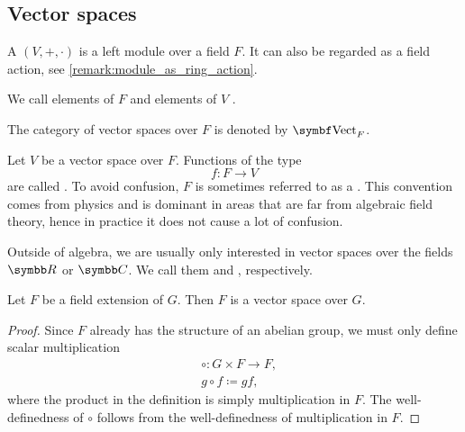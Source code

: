 \subsection{Vector spaces}\label{subsec:vector_spaces}

\begin{definition}\label{def:vector_space}
  A  \( (V, +, \cdot) \) is a left module over a field \( F \). It can also be regarded as a field action, see \cref{remark:module_as_ring_action}.

  We call elements of \( F \)  and elements of \( V \) .

  The category of vector spaces over \( F \) is denoted by \( \Cat{Vect}_F \).
\end{definition}

\begin{definition}\label{def:vector_field}
  Let \( V \) be a vector space over \( F \). Functions of the type
  \begin{equation*}
    f: F \to V
  \end{equation*}
  are called . To avoid confusion, \( F \) is sometimes referred to as a . This convention comes from physics and is dominant in areas that are far from algebraic field theory, hence in practice it does not cause a lot of confusion.
\end{definition}

\begin{remark}\label{remark:real_vector_space}
  Outside of algebra, we are usually only interested in vector spaces over the fields \( \R \) or \( \BB{C} \). We call them  and , respectively.
\end{remark}

\begin{proposition}\label{thm:field_extension_is_vector_space}
  Let \( F \) be a field extension of \( G \). Then \( F \) is a vector space over \( G \).
\end{proposition}
\begin{proof}
  Since \( F \) already has the structure of an abelian group, we must only define scalar multiplication
  \begin{align*}
    &\circ: G \times F \to F, \\
    &g \circ f \coloneqq gf,
  \end{align*}
  where the product in the definition is simply multiplication in \( F \). The well-definedness of \( \circ \) follows from the well-definedness of multiplication in \( F \).
\end{proof}

